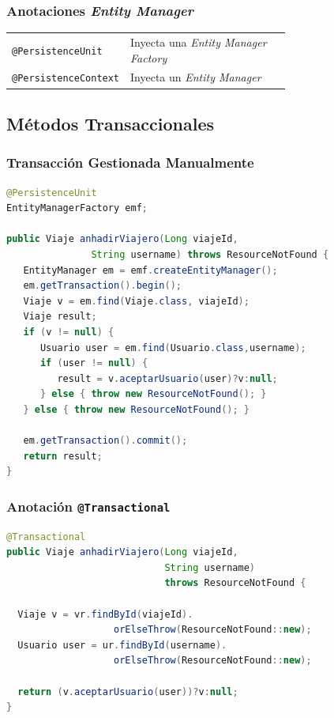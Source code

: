 \documentclass[handout,a4paper,slidestop,xcolor=pst,blue]{beamer}
\newcommand{\ann}[1]{\color{blue}\texttt{#1}\color{black}}
\begin{document}
\begin{frame}[c]
    \frametitle{Anotaciones \emph{Entity Manager}}
    \begin{tabular}{lp{0.70\linewidth}}
        \ann{@PersistenceUnit}    & Inyecta una \emph{Entity Manager Factory} \\
        \ann{@PersistenceContext} & Inyecta un \emph{Entity Manager} \\
    \end{tabular}
\end{frame}

\subsection{Métodos Transaccionales}

\begin{frame}[c,fragile]
    \frametitle{Transacción Gestionada Manualmente}
\begin{lstlisting}[basicstyle=\footnotesize,language=Java]
@PersistenceUnit
EntityManagerFactory emf;

public Viaje anhadirViajero(Long viajeId, 
               String username) throws ResourceNotFound {
   EntityManager em = emf.createEntityManager();
   em.getTransaction().begin();
   Viaje v = em.find(Viaje.class, viajeId);
   Viaje result;
   if (v != null) {
      Usuario user = em.find(Usuario.class,username);
      if (user != null) {
         result = v.aceptarUsuario(user)?v:null;
      } else { throw new ResourceNotFound(); }
   } else { throw new ResourceNotFound(); }
	
   em.getTransaction().commit();
   return result;
}
\end{lstlisting}
\end{frame}


\begin{frame}[c,fragile]
    \frametitle{Anotación \ann{@Transactional}}
\begin{lstlisting}[basicstyle=\small,language=Java]
@Transactional
public Viaje anhadirViajero(Long viajeId, 
                            String username) 
                            throws ResourceNotFound {
	
  Viaje v = vr.findById(viajeId).
                   orElseThrow(ResourceNotFound::new);
  Usuario user = ur.findById(username).
                   orElseThrow(ResourceNotFound::new);
	
  return (v.aceptarUsuario(user))?v:null;
}
\end{lstlisting}
\end{frame}
\end{document}
